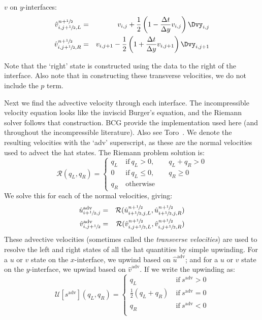 \noindent $v$ on $y$-interfaces:
\begin{eqnarray}
\hat{v}_{i,j+\myhalf,L}^{n+\myhalf} &=&
   v_{i,j} + \frac{1}{2} \left ( 1 - \frac{\Delta t}{\Delta y} v_{i,j} \right )
       \Dvy_{i,j} \\
%
\hat{v}_{i,j+\myhalf,R}^{n+\myhalf} &=&
   v_{i,j+1} - \frac{1}{2} \left ( 1 + \frac{\Delta t}{\Delta y} v_{i,j+1} \right )
       \Dvy_{i,j+1}
\end{eqnarray}

Note that the `right' state is constructed using the data to the right
of the interface.  Also note that in constructing these transverse
velocities, we do not include the $p$ term.

Next we find the advective velocity through each interface.
The incompressible
velocity equation looks like the inviscid Burger's equation, and the
Riemann solver follows that construction.  BCG provide the implementation
used here (and throughout the incompressible literature).  Also see Toro~\cite{toro:1997}.
We denote the resulting velocities with the `adv' superscript, as these
are the normal velocities used to advect the hat states.  The Riemann
problem solution is:
\begin{equation}
\mathcal{R}(q_L,q_R) = \left \{ \begin{array}{cl}
   q_L  & \mathrm{~if~} q_L > 0, \qquad q_L + q_R > 0 \\
   0          & \mathrm{~if~} q_L \le 0, \qquad q_R \ge 0 \\
   q_R  & \mathrm{~otherwise}
  \end{array}
  \right .
\end{equation}
We solve this for each of the normal velocities, giving:
\begin{eqnarray}
\hat{u}^\mathrm{adv}_{i+\myhalf,j} &=&
    \mathcal{R}(\hat{u}_{i+\myhalf,j,L}^{n+\myhalf}, \hat{u}_{i+\myhalf,j,R}^{n+\myhalf}) \\
%
\hat{v}^\mathrm{adv}_{i,j+\myhalf} &=&
    \mathcal{R}(\hat{v}_{i,j+\myhalf,L}^{n+\myhalf}, \hat{v}_{i,j+\myhalf,R}^{n+\myhalf})
\end{eqnarray}
These advective velocities (sometimes called the {\em transverse
  velocities}) are used to resolve the left and right states of all the
hat quantities by simple upwinding.  For a $u$ or $v$ state on the
$x$-interface, we upwind based on $\hat{u}^\mathrm{adv}$; and for a
$u$ or $v$ state on the $y$-interface, we upwind based on
$\hat{v}^\mathrm{adv}$.  If we write the upwinding as:
\begin{equation}
\mathcal{U}[s^\mathrm{adv}](q_L, q_R) =
  \left \{
  \begin{array}{cl}
  q_L                    & \mathrm{~if~} s^\mathrm{adv} > 0 \\
  \frac{1}{2}(q_L + q_R) & \mathrm{~if~} s^\mathrm{adv} = 0 \\
  q_R                    & \mathrm{~if~} s^\mathrm{adv} < 0 \\
  \end{array}
  \right .
\end{equation}

